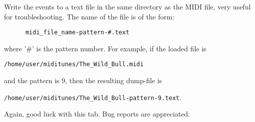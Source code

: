    Write the events to a text file in the same directory as the MIDI file, very
   useful for troubleshooting.  The name of the file is of the form:

   \begin{verbatim}
      midi_file_name-pattern-#.text
   \end{verbatim}

   where '\#' is the pattern number.  For example, if the loaded file is

   \texttt{/home/user/miditunes/The\_Wild\_Bull.midi}

   and the pattern is 9, then the resulting dump-file is

   \texttt{/home/user/miditunes/The\_Wild\_Bull-pattern-9.text}.

   Again, good luck with this tab.  Bug reports are appreciated.

